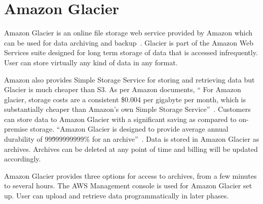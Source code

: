 \section{Amazon Glacier}

Amazon Glacier is an online file storage web service provided by Amazon which
can be used for data archiving and backup~\cite{hid-sp18-420-Amazon-Glacier}.
Glacier is part of the Amazon Web Services suite designed for long term storage
of data that is accessed infrequently. User can store virtually any kind of data
in any format.

Amazon also provides Simple Storage Service for storing and retrieving data but
Glacier is much cheaper than S3. As per Amazon documents, `` For Amazon glacier,
storage costs are a consistent \$0.004 per gigabyte per month, which is
substantially cheaper than Amazon's own Simple Storage
Service''~\cite{hid-sp18-420-Amazon-Glacier-FAQ}. Customers can store data to
Amazon Glacier with a significant saving as compared to on-premise storage.
``Amazon Glacier is designed to provide average annual durability of
99\.999999999\% for an archive''~\cite{hid-sp18-420-Amazon-Glacier}. Data is
stored in Amazon Glacier as archives. Archives can be deleted at any point of
time and billing will be updated accordingly.

Amazon Glacier provides three options for access to archives, from a few minutes
to several hours. The AWS Management console is used for Amazon Glacier set up.
User can upload and retrieve data programmatically in later phases.
